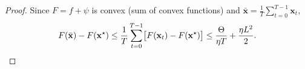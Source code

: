 \begin{proof}
Since $F = f + \psi$ is convex (sum of convex functions) and $\bar{\mathbf{x}} = \frac{1}{T}\sum_{t=0}^{T-1}\mathbf{x}_t$,
\[
F(\bar{\mathbf{x}}) - F(\mathbf{x}^\star)
\le \frac{1}{T}\sum_{t=0}^{T-1}\bigl[F(\mathbf{x}_t) - F(\mathbf{x}^\star)\bigr]
\le \frac{\Theta}{\eta T} + \frac{\eta L^2}{2}. \qedhere
\]
\end{proof}
